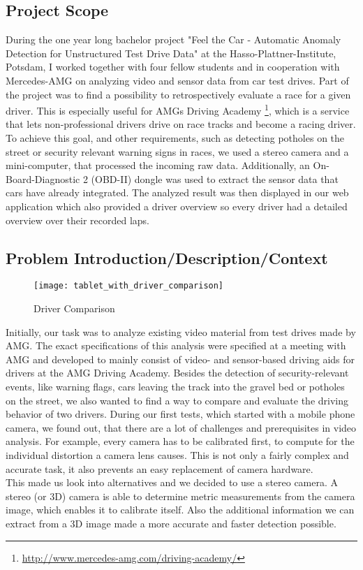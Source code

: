 \subsection{Project Scope}
During the one year long bachelor project "Feel the Car - Automatic A\-no\-ma\-ly Detection for Unstructured Test Drive Data" at the Hasso-Plattner-Institute, Potsdam, I worked together with four fellow students and in cooperation with Mercedes-AMG on analyzing video and sensor data from car test drives.
Part of the project was to find a possibility to retrospectively evaluate a race for a given driver. This is especially useful for AMGs Driving Academy \footnote{\url{http://www.mercedes-amg.com/driving-academy/}}, which is a service that lets non-professional drivers drive on race tracks and become a racing driver. To achieve this goal, and other requirements, such as detecting potholes on the street or security relevant warning signs in races, we used a stereo camera and a mini-computer, that processed the incoming raw data.
Additionally, an On-Board-Diagnostic 2 (OBD-II) dongle was used to extract the sensor data that cars have already integrated.
The analyzed result was then displayed in our web application which also provided a driver overview so every driver had a detailed overview over their recorded laps.
\clearpage

\subsection{Problem Introduction/Description/Context}

\begin{figure}[!ht]
	\centering
	\texttt{[image: tablet\_with\_driver\_comparison]}
	\caption{Driver Comparison}
	\label{fig:comparison_with_overlay}
\end{figure}

Initially, our task was to analyze existing video material from test drives made by AMG. The exact specifications of this analysis were specified at a meeting with AMG and developed to mainly consist of video- and sensor-based driving aids for drivers at the AMG Driving Academy. Besides the detection of security-relevant events, like warning flags, cars leaving the track into the gravel bed or potholes on the street, we also wanted to find a way to compare and evaluate the driving behavior of two drivers.
During our first tests, which started with a mobile phone camera, we found out, that there are a lot of challenges and prerequisites in video analysis. For example, every camera has to be calibrated first, to compute for the individual distortion a camera lens causes. This is not only a fairly complex and accurate task, it also prevents an easy replacement of camera hardware.\\
This made us look into alternatives and we decided to use a stereo camera. A stereo (or 3D) camera is able to determine metric measurements from the camera image, which enables it to calibrate itself. Also the additional information we can extract from a 3D image made a more accurate and faster detection possible.\\


